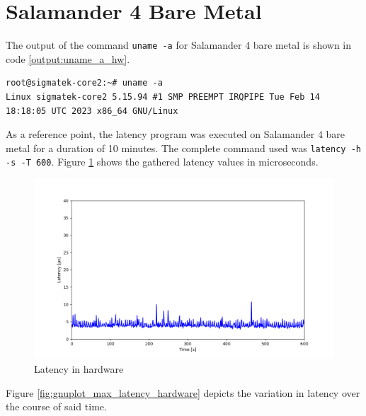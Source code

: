 \documentclass[MMR,Master,english]{twbook}
\begin{document}
\section{Salamander 4 Bare Metal}\label{sec:salamander4-bare-metal}
The output of the command \texttt{uname -a} for Salamander 4 bare metal is shown in code \ref{output:uname_a_hw}.

\vspace{1em}
\begin{minipage}{0.95\columnwidth}
	\begin{lstlisting}[name={Salamander 4 bare metal system information},label={output:uname_a_hw}]
root@sigmatek-core2:~# uname -a 
Linux sigmatek-core2 5.15.94 #1 SMP PREEMPT IRQPIPE Tue Feb 14 18:18:05 UTC 2023 x86_64 GNU/Linux
\end{lstlisting}
\end{minipage}

\noindent As a reference point, the latency program was executed on Salamander 4 bare metal for a duration of 10 minutes. The complete command used was \texttt{latency -h -s -T 600}. Figure \ref{fig:max_latency_hardware} shows the gathered latency values in microseconds.

\begin{figure}[H]
	\centering
	\includegraphics[width=1.0\columnwidth]{img/max_latency_hardware.png}
	\caption[Latency in hardware]{Latency in hardware}
	\label{fig:max_latency_hardware}
\end{figure}

Figure \ref{fig:gnuplot_max_latency_hardware} depicts the variation in latency over the course of said time. 
\end{document}
